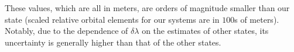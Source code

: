 These values, which are all in meters, are orders of magnitude smaller than our state (scaled relative orbital elements for our systems are in $100$s of meters). Notably, due to the dependence of $\delta \lambda$ on the estimates of other states, its uncertainty is generally higher than that of the other states.